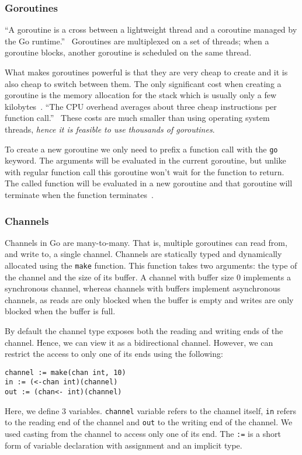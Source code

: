 \subsubsection{Goroutines}
``A goroutine is a cross between a lightweight thread and a coroutine
managed by the Go runtime.''~\cite[2]{whitehead} Goroutines are multiplexed
on a set of threads; when a goroutine blocks, another goroutine is scheduled
on the same thread. 

What makes goroutines powerful is that they are very cheap to create and 
it is also cheap to switch between them. The only significant cost when 
creating a goroutine is the memory allocation for the stack which is 
usually only a few kilobytes~\cite{FAQ}. ``The CPU overhead averages about 
three cheap instructions per function call.''~\cite{FAQ} These costs are much 
smaller than using operating system threads, \textit{hence it is feasible to use 
thousands of goroutines}.

To create a new goroutine we only need to prefix a function call with
the \texttt{go} keyword. The arguments will be evaluated in the current
goroutine, but unlike with regular function call this goroutine won't
wait for the function to return. The called 
function will be evaluated in a new goroutine and that goroutine will 
terminate when the function terminates~\cite{GoDocumentation}.

\subsubsection{Channels}
Channels in Go are many-to-many. That is, multiple goroutines can
read from, and write to, a single channel. Channels are statically typed and
dynamically allocated using the \texttt{make} function. This function takes 
two arguments: the type of the channel and the size of its buffer.
A channel with buffer size 0 implements a synchronous channel, whereas 
channels with buffers implement asynchronous channels, as reads
are only blocked when the buffer is empty and writes are only blocked
when the buffer is full.

By default the channel type exposes both the reading and writing ends of the
channel. Hence, we can view it as a bidirectional channel. 
However, we can restrict the access to only one of its ends using the following:
\begin{lstlisting}
channel := make(chan int, 10)
in := (<-chan int)(channel)
out := (chan<- int)(channel)
\end{lstlisting}
Here, we define 3 variables. \texttt{channel} variable refers to the 
channel itself, \texttt{in} refers to the reading end of the channel
and \texttt{out} to the writing end of the channel. We used casting
from the channel to access only one of its end. The \texttt{:=} is a
short form of variable declaration with assignment and an implicit type.

